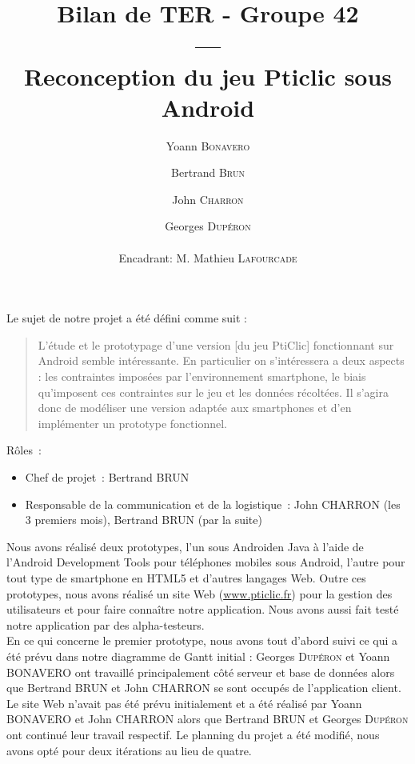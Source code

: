 \documentclass[a4paper,11pt,french]{article}
\title{Bilan de TER - Groupe 42\\---\\Reconception du jeu Pticlic sous Android}
\author{Yoann \textsc{Bonavero} \and Bertrand \textsc{Brun} \and John \textsc{Charron} \and Georges \textsc{Dupéron} \\\\ Encadrant: M. Mathieu \textsc{Lafourcade}}
\begin{document}

\maketitle
\noindent Le sujet de notre projet a été défini comme suit : 

\begin{quotation}
\noindent L'étude et le prototypage d'une version [du jeu PtiClic] fonctionnant sur Android semble intéressante. En particulier on s'intéressera a deux aspects : les contraintes imposées par l'environnement smartphone, le biais qu'imposent ces contraintes sur le jeu et les données récoltées. Il s'agira donc de modéliser une version adaptée aux smartphones et d'en implémenter un prototype fonctionnel. \\
\end{quotation}

\noindent Rôles~:
\begin{itemize}
\item Chef de projet~: Bertrand \textsc{BRUN}
\item Responsable de la communication et de la logistique~: John \textsc{CHARRON} (les 3 premiers mois), Bertrand \textsc{BRUN} (par la suite) \\
\end{itemize}

\noindent Nous avons réalisé deux prototypes, l'un sous Android\texttrademark en Java à l'aide de l'Android Development Tools pour téléphones mobiles sous Android\texttrademark, l'autre pour tout type de smartphone en HTML5 et d'autres langages Web. Outre ces prototypes, nous avons réalisé un site Web (\url{www.pticlic.fr}) pour la gestion des utilisateurs et pour faire connaître notre application. Nous avons aussi fait testé notre application par des alpha-testeurs.
\\

\noindent En ce qui concerne le premier prototype, nous avons tout d'abord suivi ce qui a été prévu dans notre diagramme de Gantt initial : Georges \textsc{Dupéron} et Yoann \textsc{BONAVERO} ont travaillé principalement côté serveur et base de données alors que Bertrand \textsc{BRUN} et John \textsc{CHARRON} se sont occupés de l'application client. Le site Web n'avait pas été prévu initialement et a été réalisé par Yoann \textsc{BONAVERO} et John \textsc{CHARRON} alors que Bertrand \textsc{BRUN} et Georges \textsc{Dupéron} ont continué leur travail respectif. Le planning du projet a été modifié, nous avons opté pour deux itérations au lieu de quatre.
\\
\end{document}
